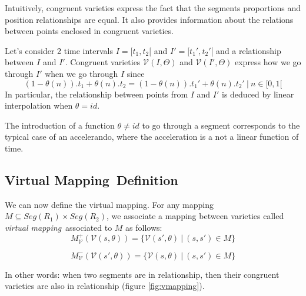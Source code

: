 \documentclass[letterpaper, 12pt]{article}
\newcommand{\seg}[1]			{Seg(#1)}
\newcommand{\variete}			{\ensuremath{\mathcal{V}}}
\newcommand{\identite}		{\ensuremath{id}}
\newcommand{\VDMapping}		{Virtual Mapping}
\newcommand{\vdmapping}		{virtual mapping}
\newcommand{\VDMapping}		{Continuous Mapping}
\newcommand{\vdmapping}		{continuous mapping}
\begin{document}
Intuitively, congruent varieties express the fact that the segments proportions and position relationships are equal. It also provides information about the relations between points enclosed in congruent varieties. 

Let's consider 2 time intervals $I=[t_1, t_2[$ and $I'=[t_1',t_2'[$ and a relationship between $I$ and $I'$. Congruent varieties $\variete(I, \Theta)$ and $\variete(I', \Theta)$ express how we go through $I'$ when we go through $I$ since 
\[
(1 - \theta(n)).t_1 + \theta(n).t_2 = (1 - \theta(n)).t_1' + \theta(n).t_2' \ | \ n \in [0, 1[
\]
In particular, the relationship between points from $I$ and $I'$ is deduced by linear interpolation when $\theta=\identite$.

The introduction of a function $\theta \ne id$ to go through a segment corresponds to the typical case of an accelerando, where the acceleration is a not a linear function of time.


\subsection{\VDMapping\ Definition} \label{subsec:vmap}
We can now define the \vdmapping .
For any mapping $M\subseteq \seg{R_1}\times \seg{R_2}$, we associate a mapping between varieties called \emph{\vdmapping}\ associated to $M$ as follows:
\begin{equation}
M_{\variete}^+(\variete(s,\theta))  = \{ \variete(s',\theta)\ |\ (s, s') \in M \}
\end{equation}

\begin{equation}
M_{\variete}^-(\variete(s',\theta)) = \{ \variete(s,\theta)\ |\ (s, s') \in M \}
\end{equation}


In other words: when two segments are in relationship, then their congruent varieties are also in relationship (figure \ref{fig:vmapping}).
\end{document}
